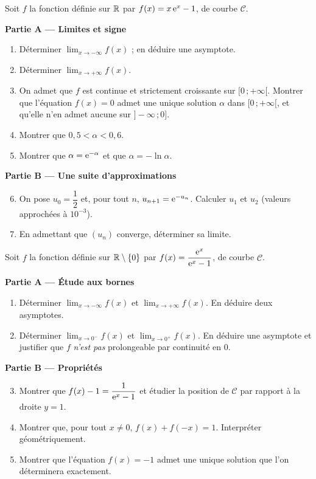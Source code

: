 Soit $f$ la fonction définie sur $\mathbb{R}$ par $f(x)=x\,\mathrm{e}^{x}-1$, de courbe
$\mathcal C$.

\textbf{Partie A — Limites et signe}
\begin{enumerate}
	\item Déterminer $\displaystyle\lim_{x\to-\infty}f(x)$ ; en déduire une
	asymptote.
	\item Déterminer $\displaystyle\lim_{x\to+\infty}f(x)$.
	\item On admet que $f$ est continue et strictement croissante sur
	$[0\,;+\infty[$. Montrer que l'équation $f(x)=0$ admet une unique solution
	$\alpha$ dans $[0\,;+\infty[$, et qu'elle n'en admet aucune sur
	$]-\infty\,;0]$.
	\item Montrer que $0{,}5<\alpha<0{,}6$.
	\item Montrer que $\alpha=\mathrm{e}^{-\alpha}$ et que $\alpha=-\ln\alpha$.
\end{enumerate}

\textbf{Partie B — Une suite d'approximations}
\begin{enumerate}
	\setcounter{enumi}{5}
	\item On pose $u_0=\dfrac{1}{2}$ et, pour tout $n$, $u_{n+1}=\mathrm{e}^{-u_n}$.
	Calculer $u_1$ et $u_2$ (valeurs approchées à $10^{-3}$).
	\item En admettant que $(u_n)$ converge, déterminer sa limite.
\end{enumerate}

Soit $f$ la fonction définie sur $\mathbb{R}\setminus\{0\}$ par
$f(x)=\dfrac{\mathrm{e}^{x}}{\mathrm{e}^{x}-1}$, de courbe $\mathcal C$.

\textbf{Partie A — Étude aux bornes}
\begin{enumerate}
	\item Déterminer $\displaystyle\lim_{x\to-\infty}f(x)$ et
	$\displaystyle\lim_{x\to+\infty}f(x)$. En déduire deux asymptotes.
	\item Déterminer $\displaystyle\lim_{x\to 0^-}f(x)$ et
	$\displaystyle\lim_{x\to 0^+}f(x)$. En déduire une asymptote et justifier
	que $f$ \emph{n'est pas} prolongeable par continuité en $0$.
\end{enumerate}

\textbf{Partie B — Propriétés}
\begin{enumerate}
	\setcounter{enumi}{2}
	\item Montrer que $f(x)-1=\dfrac{1}{\mathrm{e}^{x}-1}$ et étudier la position de
	$\mathcal C$ par rapport à la droite $y=1$.
	\item Montrer que, pour tout $x\neq 0$, $f(x)+f(-x)=1$. Interpréter
	géométriquement.
	\item Montrer que l'équation $f(x)=-1$ admet une unique solution que l'on
	déterminera exactement.
\end{enumerate}
